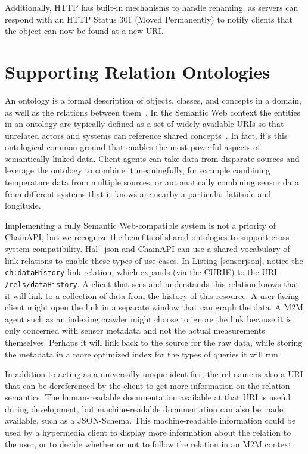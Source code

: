 \documentclass{acm_proc_article-sp}
\begin{document}
Additionally, HTTP has built-in mechanisms to handle renaming, as servers can
respond with an HTTP Status 301 (Moved Permanently) to notify clients that the
object can now be found at a new URI.

\section{Supporting Relation Ontologies}

An ontology is a formal description of objects, classes, and concepts in a
domain, as well as the relations between them~\cite{gruber1993}. In the
Semantic Web context the entities in an ontology are typically defined as a set
of widely-available URIs so that unrelated actors and systems can reference
shared concepts~\cite{bernerslee2001semantic}. In fact, it's this ontological
common ground that enables the most powerful aspects of semantically-linked
data. Client agents can take data from disparate sources and leverage the
ontology to combine it meaningfully, for example combining temperature data
from multiple sources, or automatically combining sensor data from different
systems that it knows are nearby a particular latitude and longitude.

Implementing a fully Semantic Web-compatible system is not a priority of
ChainAPI, but we recognize the benefits of shared ontologies to support
cross-system compatibility. Hal+json and ChainAPI can use a shared vocabulary
of link relations to enable these types of use cases. In Listing
\ref{sensorjson}, notice the \texttt{ch:dataHistory} link relation, which
expands (via the CURIE) to the URI \texttt{/rels/dataHistory}. A client that
sees and understands this relation knows that it will link to a collection of
data from the history of this resource. A user-facing client might open the
link in a separate window that can graph the data. A M2M agent such as an
indexing crawler might choose to ignore the link because it is only concerned
with sensor metadata and not the actual measurements themselves. Perhaps it
will link back to the source for the raw data, while storing the metadata in a
more optimized index for the types of queries it will run.

In addition to acting as a universally-unique identifier, the rel name is also
a URI that can be dereferenced by the client to get more information on the
relation semantics. The human-readable documentation available at that URI is
useful during development, but machine-readable documentation can also be made
available, such as a JSON-Schema. This machine-readable information could be
used by a hypermedia client to display more information about the relation to
the user, or to decide whether or not to follow the relation in an M2M context.
\end{document}
